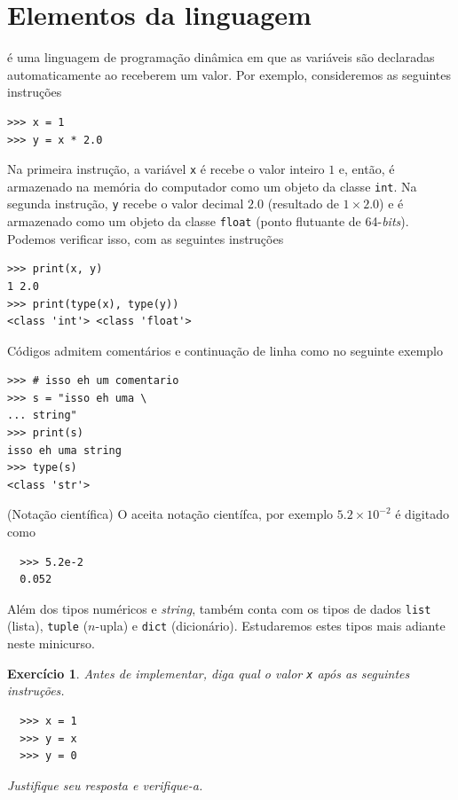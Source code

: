 \documentclass[12pt]{article}
\newtheorem{exr}{Exercício}[section]
\begin{document}
\section{Elementos da linguagem}\label{sec_elem}

{\python} é uma linguagem de programação dinâmica em que as variáveis são declaradas automaticamente ao receberem um valor. Por exemplo, consideremos as seguintes instruções
\begin{lstlisting}
>>> x = 1
>>> y = x * 2.0
\end{lstlisting}
Na primeira instrução, a variável \lstinline+x+ é recebe o valor inteiro $1$ e, então, é armazenado na memória do computador como um objeto da classe \lstinline+int+. Na segunda instrução, \lstinline+y+ recebe o valor decimal $2.0$ (resultado de $1\times 2.0$) e é armazenado como um objeto da classe \lstinline+float+ (ponto flutuante de 64-{\it bits}). Podemos verificar isso, com as seguintes instruções
\begin{lstlisting}
>>> print(x, y)
1 2.0
>>> print(type(x), type(y))
<class 'int'> <class 'float'>
\end{lstlisting}

Códigos {\python} admitem comentários e continuação de linha como no seguinte exemplo
\begin{lstlisting}
>>> # isso eh um comentario
>>> s = "isso eh uma \
... string"
>>> print(s)
isso eh uma string
>>> type(s)
<class 'str'>
\end{lstlisting}

\begin{obs}(Notação científica)
  O {\python} aceita notação científca, por exemplo $5.2\times 10^{-2}$ é digitado como
  \begin{lstlisting}
  >>> 5.2e-2
  0.052
  \end{lstlisting}
\end{obs}

\begin{obs}
  Além dos tipos numéricos e {\it string}, {\python} também conta com os tipos de dados \lstinline+list+ (lista), \lstinline+tuple+ ($n$-upla) e \lstinline+dict+ (dicionário). Estudaremos estes tipos mais adiante neste minicurso.
\end{obs}

\begin{exr}
  Antes de implementar, diga qual o valor \lstinline+x+ após as seguintes instruções.
  \begin{lstlisting}
  >>> x = 1
  >>> y = x
  >>> y = 0
  \end{lstlisting}
  Justifique seu resposta e verifique-a.
\end{exr}
\end{document}
